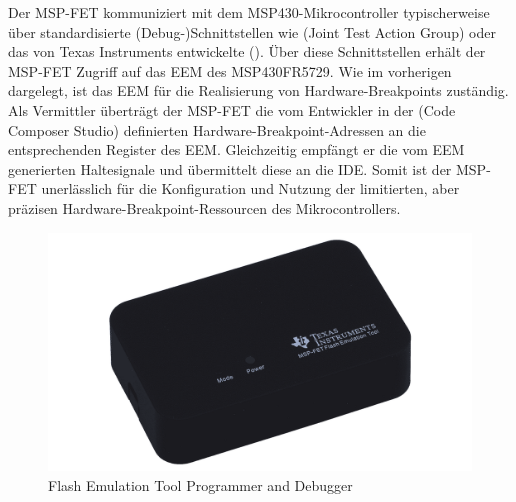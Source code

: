 Der MSP-FET kommuniziert mit dem MSP430-Mikrocontroller typischerweise \"uber standardisierte (Debug-)Schnittstellen wie  (Joint Test Action Group) oder das von Texas Instruments entwickelte  (). \"Uber diese Schnittstellen erh\"alt der MSP-FET Zugriff auf das EEM des MSP430FR5729. Wie im vorherigen  dargelegt, ist das EEM f\"ur die Realisierung von Hardware-Breakpoints zust\"andig. Als Vermittler \"ubertr\"agt der MSP-FET die vom Entwickler in der  (Code Composer Studio) definierten Hardware-Breakpoint-Adressen an die entsprechenden Register des EEM. Gleichzeitig empf\"angt er die vom EEM generierten Haltesignale und \"ubermittelt diese an die IDE. Somit ist der MSP-FET unerl\"asslich f\"ur die Konfiguration und Nutzung der limitierten, aber pr\"azisen Hardware-Breakpoint-Ressourcen des Mikrocontrollers. 

\newpage
\begin{figure}[h!]
	\centering
	\includegraphics[width=1.0\textwidth]{../Bilder/msp_fet.png}
	\caption{Flash Emulation Tool Programmer and Debugger }
	\label{fig:msp_fet}
\end{figure}

